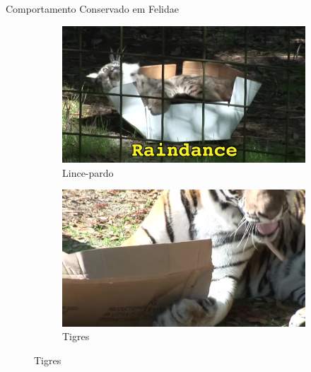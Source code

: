 \documentclass[final]{beamer}
\begin{document}
\begin{frame}[t]
\begin{columns}[T]
\begin{column}{.32\linewidth}
\begin{block}{Comportamento Conservado em Felidae}
\begin{figure}
            \vspace{1em}
            
            \begin{subfigure}[b]{0.49\textwidth}
                \includegraphics[width=\textwidth]{03_raindance_bobcat.jpg}
                \caption{Lince-pardo}
            \end{subfigure}
            \hfill
            \begin{subfigure}[b]{0.49\textwidth}
                \includegraphics[width=\textwidth]{04_andre_arthur_tigers.jpg}
                \caption{Tigres}
            \end{subfigure}

            \vspace{1em}
            

\end{figure}
\end{block}
\end{column}
\end{columns}
\end{frame}
\end{document}
